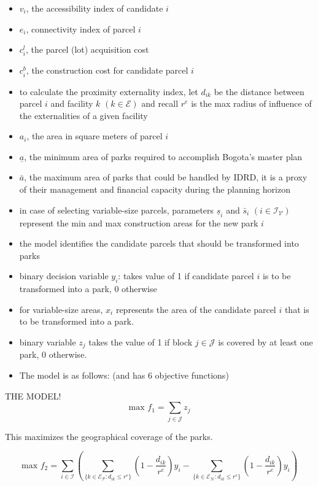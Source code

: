 \documentclass{article}
\begin{document}
\begin{itemize}
\item $v_i$, the accessibility index of candidate $i$
\item $e_i$, connectivity index of parcel $i$
\item $c_i^l$, the parcel (lot) acquisition cost
\item $c_i^b$, the construction cost for candidate parcel $i$
\item to calculate the proximity externality index, let $d_{ik}$ be the distance between parcel $i$ and facility $k$ $(k \in \mathcal{E})$ and recall $r^e$ is the max radius of influence of the externalities of a given facility
\item $a_i$, the area in square meters of parcel $i$
\item $\underline{a}$, the minimum area of parks required to accomplish Bogota's master plan
\item $\bar{a}$, the maximum area of parks that could be handled by IDRD, it is a proxy of their management and financial capacity during the planning horizon
\item in case of selecting variable-size parcels, parameters $\underline{s}_i$ and $\bar{s}_i$ $(i \in \mathcal{I_V})$ represent the min and max construction areas for the new park $i$
\item the model identifies the candidate parcels that should be transformed into parks
\item binary decision variable $y_i$: takes value of 1 if candidate parcel $i$ is to be transformed into a park, 0 otherwise
\item for variable-size areas, $x_i$ represents the area of the candidate parcel $i$ that is to be transformed into a park.
\item binary variable $z_j$ takes the value of 1 if block $j \in \mathcal{J}$  is covered by at least one park, 0 otherwise.
\item The model is as follows: (and has 6 objective functions) \newline
\end{itemize} 
{\large THE MODEL!}
\begin{equation}
\textrm{max } f_1 = \sum_{j \in \mathcal{J}} z_j
\end{equation}

This maximizes the geographical coverage of the parks.

\begin{equation}
\textrm{max } f_2 = \sum_{i \in \mathcal{I}}  \left( \sum_{\{k \in \mathcal{E_P}: d_{ik} \leq r^e  \}} \left( 1-\frac{d_{ik}}{r^e} \right) y_i  -   \sum_{\{k \in \mathcal{E_N}: d_{ik} \leq r^e  \}} \left( 1-\frac{d_{ik}}{r^e} \right) y_i   \right)
\end{equation}
\end{document}
